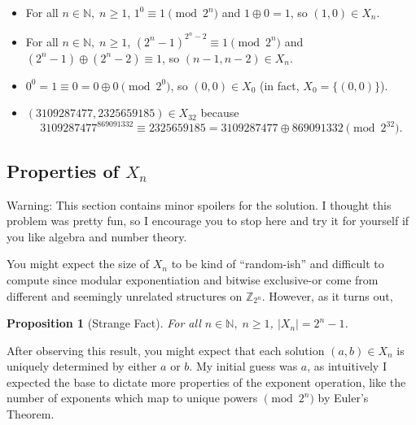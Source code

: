 \documentclass[1gpt]{article}
\theoremstyle{break}
\newtheorem{proposition}[theorem]{Proposition}
\newcommand{\xor}{\oplus}
\begin{document}
\begin{itemize}

    \item

        For all $n \in \mathbb{N},\; n \geq 1$, $1^0 \equiv 1 \pmod{2^n}$ and
        $1 \xor 0 = 1$, so $(1, 0) \in X_n$.

    \item

        For all $n \in \mathbb{N}, \; n \geq 1$, $(2^n-1)^{2^n-2} \equiv 1
        \pmod{2^n}$ and $(2^n-1) \xor (2^n-2) \equiv 1$, so $(n-1, n-2) \in
        X_n$.

    \item

        $0^0 = 1 \equiv 0 = 0 \xor 0 \pmod{2^0}$, so $(0, 0) \in X_0$ (in fact,
        $X_0 = \{(0, 0)\}$).

    \item

        $(3109287477, 2325659185) \in X_{32}$ because $$3109287477^{869091332}
        \equiv 2325659185 = 3109287477 \xor 869091332 \pmod{2^{32}}.$$

\end{itemize}

\subsection{Properties of \texorpdfstring{$X_n$}{Xn}}

Warning: This section contains minor spoilers for the solution. I thought this
problem was pretty fun, so I encourage you to stop here and try it for yourself
if you like algebra and number theory.

You might expect the size of $X_n$ to be kind of ``random-ish'' and difficult
to compute since modular exponentiation and bitwise exclusive-or come from
different and seemingly unrelated structures on $\mathbb{Z}_{2^n}$. However, as
it turns out,

\begin{proposition}[Strange Fact]
    For all $n \in \mathbb{N}, \; n \geq 1$, $|X_n| = 2^n - 1$.
\end{proposition}

After observing this result, you might expect that each solution $(a, b) \in
X_n$ is uniquely determined by either $a$ or $b$. My initial guess was $a$, as
intuitively I expected the base to dictate more properties of the exponent
operation, like the number of exponents which map to unique powers $\pmod{2^n}$
by Euler's Theorem.
\end{document}
